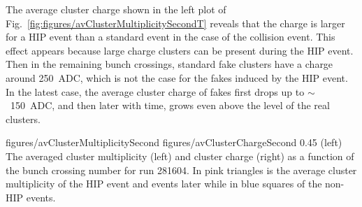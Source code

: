 The average cluster charge shown in the left plot of Fig.~\ref{fig:figures/avClusterMultiplicitySecondT} reveals that the charge is larger for a HIP event than a standard event in the case of the collision event. This effect appears because large charge clusters can be present during the HIP event. Then in the remaining bunch crossings, standard fake clusters have a charge around 250~ADC, which is not the case for the fakes induced by the HIP event. In the latest case, the average cluster charge of fakes first drops up to $\sim$~150~ADC, and then later with time, grows even above the level of the real clusters. 


                 {figures/avClusterMultiplicitySecond} %
                 {figures/avClusterChargeSecond} %
                 {0.45}       %
                 {(left) The averaged cluster multiplicity (left) and cluster charge (right) as a function of the bunch crossing number for run 281604. In pink triangles is the average cluster multiplicity of the HIP event and events later while in blue squares of the non-HIP events.  } %



